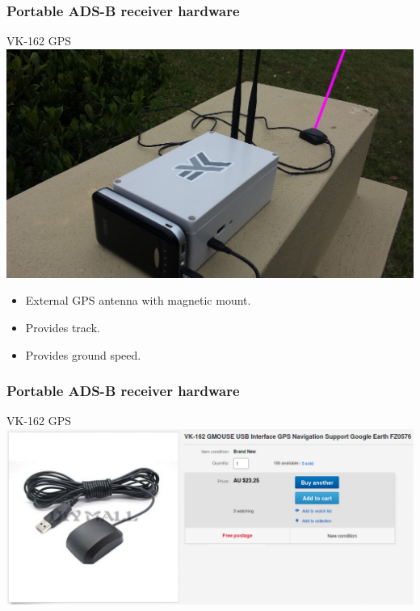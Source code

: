 \begin{frame}
\frametitle{Portable ADS-B receiver hardware}
\begin{block}{VK-162 GPS}
\includegraphics[height=0.5\textheight]{image/adsb-hardware-vk162.png}
\begin{itemize}
\item External GPS antenna with magnetic mount.
\item Provides track.
\item Provides ground speed.
\end{itemize}
\end{block}
\end{frame}

\begin{frame}
\frametitle{Portable ADS-B receiver hardware}
\begin{block}{VK-162 GPS}
\includegraphics[height=0.4\textheight]{image/ebay-vk162.png}
\end{block}
\end{frame}

